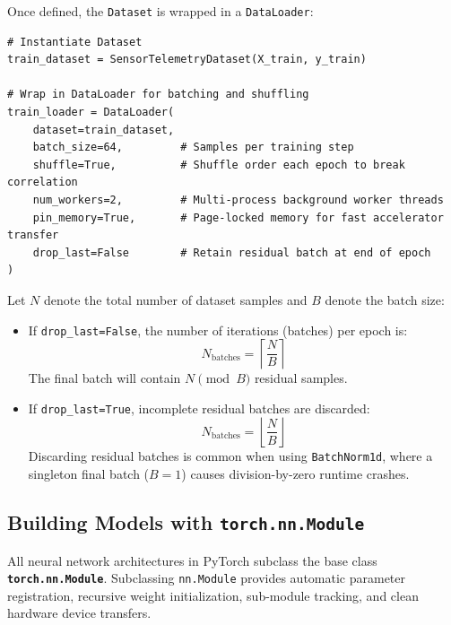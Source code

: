 Once defined, the \texttt{Dataset} is wrapped in a \texttt{DataLoader}:
\begin{lstlisting}[style=pythonstyle]
# Instantiate Dataset
train_dataset = SensorTelemetryDataset(X_train, y_train)

# Wrap in DataLoader for batching and shuffling
train_loader = DataLoader(
    dataset=train_dataset,
    batch_size=64,         # Samples per training step
    shuffle=True,          # Shuffle order each epoch to break correlation
    num_workers=2,         # Multi-process background worker threads
    pin_memory=True,       # Page-locked memory for fast accelerator transfer
    drop_last=False        # Retain residual batch at end of epoch
)
\end{lstlisting}

\begin{keyidea}
Let $N$ denote the total number of dataset samples and $B$ denote the batch size:
\begin{itemize}
    \item If \texttt{drop\_last=False}, the number of iterations (batches) per epoch is:
    \begin{equation}
    N_{\text{batches}} = \left\lceil \frac{N}{B} \right\rceil\label{eq:batches_ceil}
    \end{equation}
    The final batch will contain $N \pmod B$ residual samples.
    \item If \texttt{drop\_last=True}, incomplete residual batches are discarded:
    \begin{equation}
    N_{\text{batches}} = \left\lfloor \frac{N}{B} \right\rfloor\label{eq:batches_floor}
    \end{equation}
    Discarding residual batches is common when using \texttt{BatchNorm1d}, where a singleton final batch ($B=1$) causes division-by-zero runtime crashes.
\end{itemize}
\end{keyidea}

\subsection{Building Models with \texttt{torch.nn.Module}}\label{subsec:nn_module}

All neural network architectures in PyTorch subclass the base class \textbf{\texttt{torch.nn.Module}}. Subclassing \texttt{nn.Module} provides automatic parameter registration, recursive weight initialization, sub-module tracking, and clean hardware device transfers.

